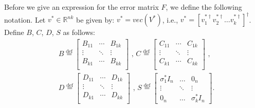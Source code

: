 \documentclass[11pt]{article}
\theoremstyle{plain}
\theoremstyle{definition}
\newcommand{\R}{\mathbb{R}}
\newcommand{\eqdef}{\stackrel{\textrm{def}}{=}}
\begin{document}
Before we give an expression for the error matrix $F$, we define the following notation.
Let $v^* \in \R^{nk}$ be given by: $v^*=vec(V^*)$, i.e., $v^*=\left[v_1^{*\dag} v_2^{*\dag}\dots v_k^{*\dag}\right]^\dag$. 
Define $B$, $C$, $D$, $S$ as follows: {\small 
\begin{align}\label{eq:BCD_k}
& B \eqdef \left[\begin{array}{ccc}
                 B_{11} & \cdots & B_{1k} \\
		 \vdots  	& \ddots &\vdots \\
                 B_{k1} & \cdots & B_{kk} \\
                \end{array} \right]
\mbox{ , }
 C \eqdef \left[\begin{array}{ccc}
                 C_{11} & \cdots & C_{1k} \\
		 \vdots  	& \ddots &\vdots \\
                 C_{k1} & \cdots & C_{kk} \\
                \end{array} \right]\mbox{ , }\nonumber\\
&D\eqdef \left[\begin{array}{ccc}
                 D_{11}  & \cdots & D_{1k} \\
		 \vdots 	& \ddots &\vdots \\
                 D_{k1} & \cdots & D_{kk} \\
                \end{array} \right]\mbox{ , }
S\eqdef \left[\begin{matrix}\sigma_1^*I_{n}&\dots&0_{n}\\\vdots&\ddots&\vdots\\0_n&\dots&\sigma_k^*I_n\end{matrix}\right]. 
\end{align}}
\end{document}
